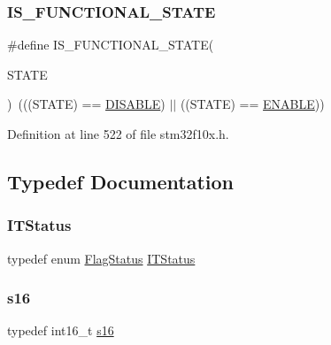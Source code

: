 \subsubsection{\texorpdfstring{I\+S\+\_\+\+F\+U\+N\+C\+T\+I\+O\+N\+A\+L\+\_\+\+S\+T\+A\+TE}{IS\_FUNCTIONAL\_STATE}}
{\footnotesize\ttfamily \#define I\+S\+\_\+\+F\+U\+N\+C\+T\+I\+O\+N\+A\+L\+\_\+\+S\+T\+A\+TE(\begin{DoxyParamCaption}\item[{}]{S\+T\+A\+TE }\end{DoxyParamCaption})~(((S\+T\+A\+TE) == \hyperlink{group___exported__types_ggac9a7e9a35d2513ec15c3b537aaa4fba1ad3a9df141be0ccf10389b640f492b26d}{D\+I\+S\+A\+B\+LE}) $\vert$$\vert$ ((S\+T\+A\+TE) == \hyperlink{group___exported__types_ggac9a7e9a35d2513ec15c3b537aaa4fba1a7d46875fa3ebd2c34d2756950eda83bf}{E\+N\+A\+B\+LE}))}



Definition at line 522 of file stm32f10x.\+h.



\subsection{Typedef Documentation}
\mbox{\label{group___exported__types_gaacbd7ed539db0aacd973a0f6eca34074}} 
\subsubsection{\texorpdfstring{I\+T\+Status}{ITStatus}}
{\footnotesize\ttfamily typedef  enum \hyperlink{group___exported__types_ga89136caac2e14c55151f527ac02daaff}{Flag\+Status}  \hyperlink{group___exported__types_gaacbd7ed539db0aacd973a0f6eca34074}{I\+T\+Status}}

\mbox{\label{group___exported__types_gaa980e2c02ba2305e0f489d5650655425}} 
\subsubsection{\texorpdfstring{s16}{s16}}
{\footnotesize\ttfamily typedef int16\+\_\+t \hyperlink{group___exported__types_gaa980e2c02ba2305e0f489d5650655425}{s16}}



